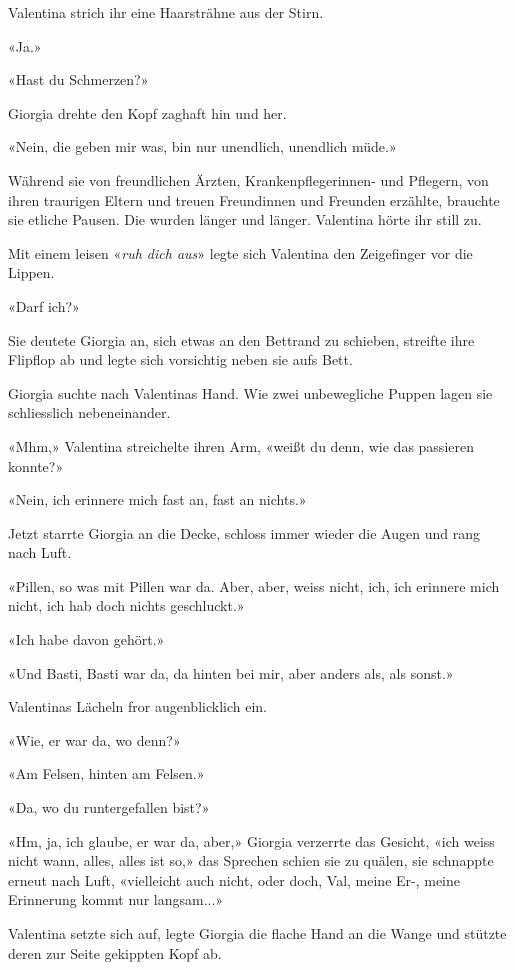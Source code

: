 Valentina strich ihr eine Haarsträhne aus der Stirn.

«Ja.»

«Hast du Schmerzen?»

Giorgia drehte den Kopf zaghaft hin und her.

«Nein, die geben mir was, bin nur unendlich, unendlich müde.»

Während sie von freundlichen Ärzten, Krankenpflegerinnen- und Pflegern,
von ihren traurigen Eltern und treuen Freundinnen und Freunden erzählte,
brauchte sie etliche Pausen. Die wurden länger und länger. Valentina
hörte ihr still zu.

Mit einem leisen «\emph{ruh dich aus}» legte sich Valentina den
Zeigefinger vor die Lippen.

«Darf ich?»

Sie deutete Giorgia an, sich etwas an den Bettrand zu schieben, streifte
ihre Flipflop ab und legte sich vorsichtig neben sie aufs Bett.

Giorgia suchte nach Valentinas Hand. Wie zwei unbewegliche Puppen lagen
sie schliesslich nebeneinander.

«Mhm,» Valentina streichelte ihren Arm, «weißt du denn, wie das
passieren konnte?»

«Nein, ich erinnere mich fast an, fast an nichts.»

Jetzt starrte Giorgia an die Decke, schloss immer wieder die Augen und
rang nach Luft.

«Pillen, so was mit Pillen war da. Aber, aber, weiss nicht, ich, ich
erinnere mich nicht, ich hab doch nichts geschluckt.»

«Ich habe davon gehört.»

«Und Basti, Basti war da, da hinten bei mir, aber anders als, als
sonst.»

Valentinas Lächeln fror augenblicklich ein.

«Wie, er war da, wo denn?»

«Am Felsen, hinten am Felsen.»

«Da, wo du runtergefallen bist?»

«Hm, ja, ich glaube, er war da, aber,» Giorgia verzerrte das Gesicht,
«ich weiss nicht wann, alles, alles ist so,» das Sprechen schien sie zu
quälen, sie schnappte erneut nach Luft, «vielleicht auch nicht, oder
doch, Val, meine Er-, meine Erinnerung kommt nur langsam...»

Valentina setzte sich auf, legte Giorgia die flache Hand an die Wange
und stützte deren zur Seite gekippten Kopf ab.

